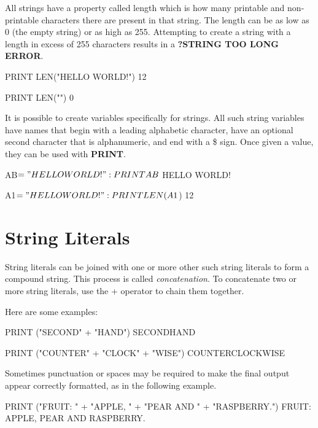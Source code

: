 All strings have a property called length which is how many printable and non-printable characters there are present in that string. The length can be as low as 0 (the empty string) or as high as 255. Attempting to create a string with a length in excess of 255 characters results in a {\bf ?STRING TOO LONG ERROR}.

\begin{screenoutput}
PRINT LEN("HELLO WORLD!")
 12
\end{screenoutput}

\begin{screenoutput}
PRINT LEN("")
 0
\end{screenoutput}

It is possible to create variables specifically for strings. All such string variables have names that begin with a leading alphabetic character, have an optional second character that is alphanumeric, and end with a \$ sign. Once given a value, they can be used with {\bf PRINT}.

\begin{screenoutput}
AB$ = "HELLO WORLD!": PRINT AB$
HELLO WORLD!
\end{screenoutput}

\begin{screenoutput}
A1$ = "HELLO WORLD!": PRINT LEN(A1$)
 12
\end{screenoutput}

\section{String Literals}
String literals can be joined with one or more other such string literals to form a compound string. This process is called {\it concatenation}. To concatenate two or more string literals, use the + operator to chain them together.

Here are some examples:

\begin{screenoutput}
PRINT ("SECOND" + "HAND")
SECONDHAND	
\end{screenoutput}

\begin{screenoutput}
PRINT ("COUNTER" + "CLOCK" + "WISE")
COUNTERCLOCKWISE
\end{screenoutput}

Sometimes punctuation or spaces may be required to make the final output appear correctly formatted, as in the following example.

\begin{screenoutput}
PRINT ("FRUIT: " + "APPLE, " + "PEAR AND " + "RASPBERRY.")
FRUIT: APPLE, PEAR AND RASPBERRY.
\end{screenoutput}

